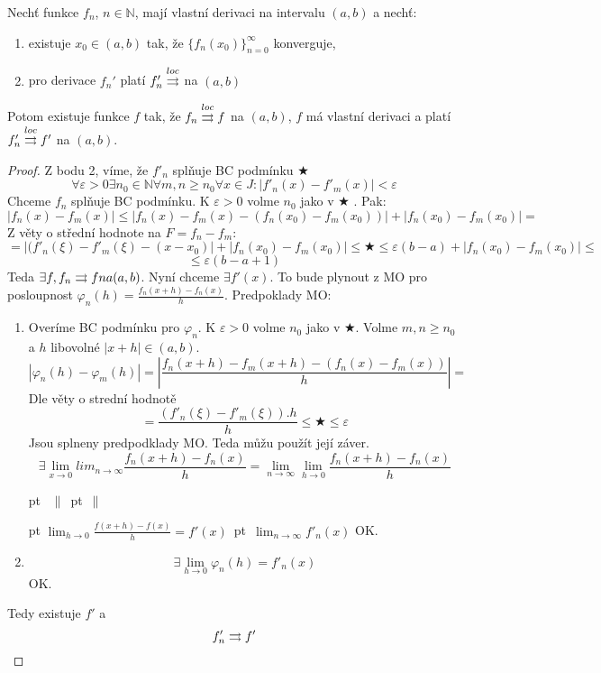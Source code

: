 \begin{vetat}
Nechť funkce $f_n$, $n \in \mathbb{N}$, mají vlastní derivaci na intervalu $(a,b)$ a nechť:
\begin{enumerate}
\item existuje $x_0 \in (a,b)$ tak, že $\{f_n(x_0)\}_{n=0}^{\infty}$ konverguje,
\item pro derivace $f_n'$ platí $f_n' \overset{loc}{\rightrightarrows}$ na $(a,b)$
\end{enumerate}
Potom existuje funkce $f$ tak, že $f_n \overset{loc}{\rightrightarrows} f$ na $(a,b)$, $f$ má vlastní derivaci a platí $f_n' \overset{loc}{\rightrightarrows} f'$ na $(a,b)$.
\end{vetat}
\begin{proof}
Z bodu 2, víme, že $f'_n$ splňuje BC podmínku $\bigstar$ 
$$\forall \varepsilon > 0 \exists n_0 \in \mathbb{N} \forall m,n \geq n_0 \forall x \in J: |f'_n(x) - f'_m(x)| < \varepsilon $$
Chceme $f_n$ splňuje BC podmínku. K $\varepsilon > 0$ volme $n_0$ jako v $\bigstar$ . Pak:
$$|f_n(x) - f_m(x)| \leq |f_n(x) - f_m(x) - (f_n(x_0) - f_m(x_0))| + |f_n(x_0) - f_m(x_0)| =$$
Z věty o střední hodnote na $F = f_n - f_m$:
$$= |(f'_n(\xi) - f'_m(\xi) - (x-x_0)| + |f_n(x_0) - f_m(x_0)| \leq \bigstar \leq \varepsilon (b-a) + |f_n(x_0) - f_m(x_0)|\leq $$
$$\leq \varepsilon (b-a+1)$$
Teda $\exists f, f_n \rightrightarrows f na (a,b)$. Nyní chceme $\exists f'(x)$. To bude plynout z MO pro posloupnost $\varphi _n (h) = \frac{f_n(x+h)-f_n(x)}{h}$.
Predpoklady MO:
\begin{enumerate}
\item Overíme BC podmínku pro $\varphi_n$. K $\varepsilon > 0$ volme $n_0$ jako v $\bigstar$. Volme $m,n \geq n_0 $ a $h$ libovolné $|x+h| \in (a,b)$.
$$|\varphi_n(h) - \varphi_m(h)| = |\frac{f_n(x+h) - f_m(x+h) - (f_n(x) - f_m(x))}{h}| = $$
Dle věty o strední hodnotě 
$$ = \frac{(f'_n(\xi) - f'_m(\xi)).h}{h}\leq \bigstar \leq \varepsilon $$
Jsou splneny predpodklady MO. Teda můžu použít její záver.
$$ \exists \lim_{x \to 0} lim_{n \to \infty} \frac{f_n(x+h) - f_n(x)}{h} = \lim_{n \to \infty} \lim_{h \to 0} \frac {f_n(x+h) - f_n(x)}{h}$$

 pt \hbox{ $\parallel$  pt  $\parallel$} \linebreak 

 pt 
\hbox {$ \lim_{h \to 0} \frac{f(x+h) - f(x)}{h} = f'(x)$
 pt 
$ \lim_{n \to \infty} f'_n(x) $} 
\linebreak
OK.
\item $$\exists \lim_{h \to 0} \varphi_n(h) = f'_n(x)$$ OK.
\end{enumerate}
Tedy existuje $f\prime$ a 
$$f'_n \rightrightarrows f' $$
\end{proof}
